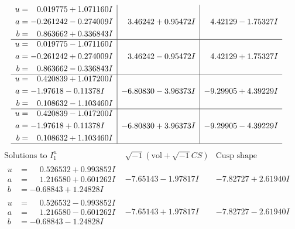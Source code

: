 \documentclass[1p]{elsarticle_modified}
\theoremstyle{definition}
\newcommand{\I}{\sqrt{-1}}
\begin{document}
$$\begin{array}{c|c|c}
\begin{aligned}
u &= \phantom{-}0.019775 + 1.071160 I \\
a &= -0.261242 - 0.274009 I \\
b &= \phantom{-}0.863662 + 0.336843 I\end{aligned}
 & \phantom{-}3.46242 + 0.95472 I & \phantom{-}4.42129 - 1.75327 I \\ \hline\begin{aligned}
u &= \phantom{-}0.019775 - 1.071160 I \\
a &= -0.261242 + 0.274009 I \\
b &= \phantom{-}0.863662 - 0.336843 I\end{aligned}
 & \phantom{-}3.46242 - 0.95472 I & \phantom{-}4.42129 + 1.75327 I \\ \hline\begin{aligned}
u &= \phantom{-}0.420839 + 1.017200 I \\
a &= -1.97618 - 0.11378 I \\
b &= \phantom{-}0.108632 - 1.103460 I\end{aligned}
 & -6.80830 - 3.96373 I & -9.29905 + 4.39229 I \\ \hline\begin{aligned}
u &= \phantom{-}0.420839 - 1.017200 I \\
a &= -1.97618 + 0.11378 I \\
b &= \phantom{-}0.108632 + 1.103460 I\end{aligned}
 & -6.80830 + 3.96373 I & -9.29905 - 4.39229 I\\
 \hline 
 \end{array}$$\newpage$$\begin{array}{c|c|c}  
\text{Solutions to }I^u_{1}& \I (\text{vol} + \sqrt{-1}CS) & \text{Cusp shape}\\
 \hline 
\begin{aligned}
u &= \phantom{-}0.526532 + 0.993852 I \\
a &= \phantom{-}1.216580 + 0.601262 I \\
b &= -0.68843 + 1.24828 I\end{aligned}
 & -7.65143 - 1.97817 I & -7.82727 + 2.61940 I \\ \hline\begin{aligned}
u &= \phantom{-}0.526532 - 0.993852 I \\
a &= \phantom{-}1.216580 - 0.601262 I \\
b &= -0.68843 - 1.24828 I\end{aligned}
 & -7.65143 + 1.97817 I & -7.82727 - 2.61940 I \\ \hline\begin{aligned}

\end{aligned}
\end{array}$$
\end{document}
